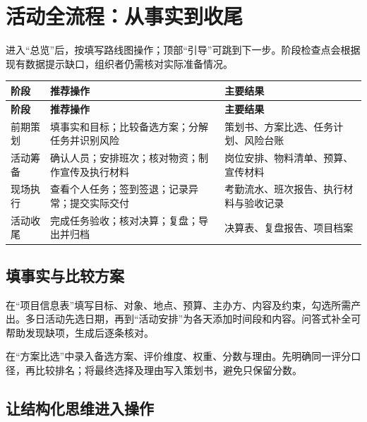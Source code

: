 \documentclass[UTF8,fontset=windows,zihao=-4,a4paper]{ctexart}
\begin{document}
\section{活动全流程：从事实到收尾}\label{sec:2}

进入“总览”后，按填写路线图操作；顶部“引导”可跳到下一步。阶段检查点会根据现有数据提示缺口，组织者仍需核对实际准备情况。


\begingroup\small\setlength{\tabcolsep}{5pt}\renewcommand{\arraystretch}{1.28}
\begin{longtable}{>{\raggedright\arraybackslash}p{0.19\dimexpr\linewidth-6\tabcolsep\relax}>{\raggedright\arraybackslash}p{0.43\dimexpr\linewidth-6\tabcolsep\relax}>{\raggedright\arraybackslash}p{0.38\dimexpr\linewidth-6\tabcolsep\relax}}
\toprule
\textbf{阶段} & \textbf{推荐操作} & \textbf{主要结果} \\
\midrule\endfirsthead
\toprule
\textbf{阶段} & \textbf{推荐操作} & \textbf{主要结果} \\
\midrule\endhead
\bottomrule\endfoot
前期策划 & 填事实和目标；比较备选方案；分解任务并识别风险 & 策划书、方案比选、任务计划、风险台账 \\
活动筹备 & 确认人员；安排班次；核对物资；制作宣传及执行材料 & 岗位安排、物料清单、预算、宣传材料 \\
现场执行 & 查看个人任务；签到签退；记录异常；提交实际交付 & 考勤流水、班次报告、执行材料与验收记录 \\
活动收尾 & 完成任务验收；核对决算；复盘；导出并归档 & 决算表、复盘报告、项目档案 \\
\end{longtable}\endgroup

\subsection*{填事实与比较方案}

在“项目信息表”填写目标、对象、地点、预算、主办方、内容及约束，勾选所需产出。多日活动先选日期，再到“活动安排”为各天添加时间段和内容。问答式补全可帮助发现缺项，生成后逐条核对。


在“方案比选”中录入备选方案、评价维度、权重、分数与理由。先明确同一评分口径，再比较排名；将最终选择及理由写入策划书，避免只保留分数。


\subsection*{让结构化思维进入操作}
\end{document}
